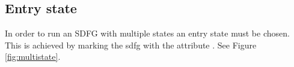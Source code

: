 \subsection{Entry state}
In order to run an SDFG with multiple states an entry state must be chosen. This is achieved by marking the sdfg with the attribute . See Figure \ref{fig:multistate}.